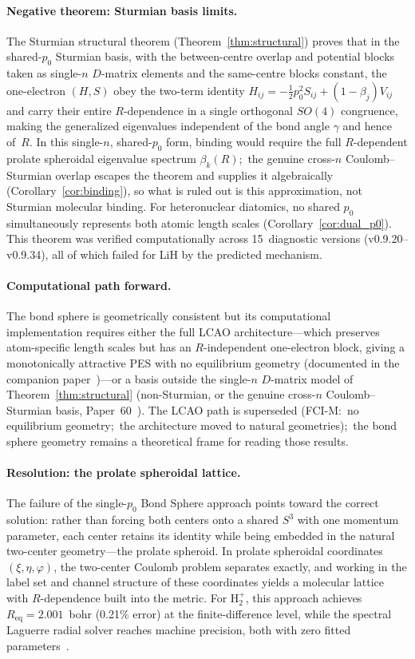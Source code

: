 \documentclass[aps,pra,twocolumn,superscriptaddress,longbibliography]{revtex4-2}
\theoremstyle{remark}
\theoremstyle{plain}
\begin{document}
\paragraph{Negative theorem: Sturmian basis limits.}
The Sturmian structural theorem (Theorem~\ref{thm:structural}) proves
that in the shared-$p_0$ Sturmian basis, with the between-centre overlap
and potential blocks taken as single-$n$ $D$-matrix elements and the
same-centre blocks constant, the one-electron
$(H,S)$ obey the
two-term identity $H_{ij} = -\tfrac12 p_0^2 S_{ij} + (1-\beta_j)V_{ij}$ and
carry their entire $R$-dependence in a single orthogonal $SO(4)$ congruence,
making the generalized eigenvalues independent of the bond angle $\gamma$
and hence of~$R$.  In this single-$n$, shared-$p_0$ form, binding would require the full
$R$-dependent prolate spheroidal eigenvalue spectrum $\beta_k(R)$;\ the genuine
cross-$n$ Coulomb--Sturmian overlap escapes the theorem and supplies it
algebraically (Corollary~\ref{cor:binding}), so what is ruled out is this
approximation, not Sturmian molecular binding.
For heteronuclear diatomics, no shared $p_0$ simultaneously represents
both atomic length scales (Corollary~\ref{cor:dual_p0}).  This theorem
was verified computationally across 15~diagnostic versions
(v0.9.20--v0.9.34), all of which failed for LiH by the predicted
mechanism.

\paragraph{Computational path forward.}
The bond sphere is geometrically consistent but its computational
implementation requires either the full LCAO architecture---which
preserves atom-specific length scales but has an $R$-independent
one-electron block, giving a monotonically attractive PES with no
equilibrium geometry (documented in the companion
paper~\cite{loutey_fci})---or a basis outside the single-$n$
$D$-matrix model of Theorem~\ref{thm:structural} (non-Sturmian, or the
genuine cross-$n$ Coulomb--Sturmian basis, Paper~60~\cite{loutey_paper60}).
The LCAO path is superseded (FCI-M:\ no equilibrium geometry;\ the
architecture moved to natural geometries);\ the bond sphere geometry
remains a theoretical frame for reading those results.

\paragraph{Resolution: the prolate spheroidal lattice.}
The failure of the single-$p_0$ Bond Sphere approach points toward the
correct solution: rather than forcing both centers onto a shared $S^3$
with one momentum parameter, each center retains its identity while
being embedded in the natural two-center geometry---the prolate
spheroid.  In prolate spheroidal coordinates $(\xi, \eta, \varphi)$,
the two-center Coulomb problem separates exactly, and working in
the label set and channel structure of these coordinates yields a molecular
lattice with $R$-dependence built into the metric.  For H$_2^+$, this
approach achieves $R_{\mathrm{eq}} = 2.001$~bohr (0.21\% error) at the
finite-difference level, while the spectral Laguerre radial solver
reaches machine precision, both with zero fitted
parameters~\cite{loutey_paper11}.
\end{document}
